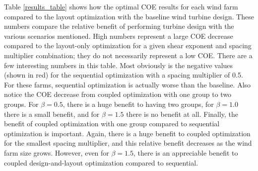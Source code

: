 \documentclass[WESD, manuscript]{copernicus}
\begin{document}
Table \ref{results_table} shows how the optimal COE results for each wind farm compared to the layout optimization with the baseline wind turbine design. These numbers compare the relative benefit of performing turbine design with the various scenarios mentioned. High numbers represent a large COE decrease compared to the layout-only optimization for a given shear exponent and spacing multiplier combination; they do not necessarily represent a low COE.
There are a few interesting numbers in this table. Most obviously is the negative values (shown in red) for the sequential optimization with a spacing multiplier of 0.5. For these farms, sequential optimization is actually worse than the baseline. Also notice the COE decrease from coupled optimization with one group to two groups. For $\beta=0.5$, there is a huge benefit to having two groups, for $\beta=1.0$ there is a small benefit, and for $\beta=1.5$ there is no benefit at all. Finally, the benefit of coupled optimization with one group compared to sequential optimization is important. Again, there is a huge benefit to coupled optimization for the smallest spacing multiplier, and this relative benefit decreases as the wind farm size grows. However, even for $\beta=1.5$, there is an appreciable benefit to coupled design-and-layout optimization compared to sequential.
\end{document}
